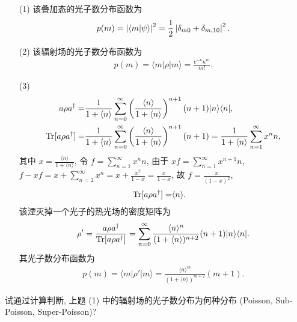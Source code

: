 \documentclass{assignment}
\begin{document}
\begin{sol}
    \begin{itemize}
        \item[(1)] 该叠加态的光子数分布函数为
        \begin{align}
            p(m)=\left\lvert\langle m\vert\psi\rangle\right\rvert^2=\frac{1}{2}\left\lvert\delta_{m0}+\delta_{m,10}\right\rvert^2.
        \end{align}
        \item[(2)] 该辐射场的光子数分布函数为
        \begin{align}
            p(m)=\langle m\rvert\rho\lvert m\rangle=\frac{e^{-\kappa}\kappa^m}{m!}.
        \end{align}
        \item[(3)] 
        \begin{align}
            a\rho a^{\dagger}=&\frac{1}{1+\langle n\rangle}\sum_{n=0}^{\infty}\left(\frac{\langle n\rangle}{1+\langle n\rangle}\right)^{n+1}(n+1)\lvert n\rangle\langle n\rvert,\\
            \notag\operatorname{Tr}[a\rho a^{\dagger}]=&\frac{1}{1+\langle n\rangle}\sum_{n=0}^{\infty}\left(\frac{\langle n\rangle}{1+\langle n\rangle}\right)^{n+1}(n+1)=\frac{1}{1+\langle n\rangle}\sum_{n=1}^{\infty}x^nn,
        \end{align}
        其中 $x=\frac{\langle n\rangle}{1+\langle n\rangle}$, 令 $f=\sum_{n=1}^{\infty}x^nn$, 由于 $xf=\sum_{n=1}^{\infty}x^{n+1}n$, $f-xf=x+\sum_{n=2}^{\infty}x^n=x+\frac{x^2}{1-x}=\frac{x}{1-x}$, 故 $f=\frac{x}{(1-x)^2}$,
        \begin{align}
            \operatorname{Tr}[a\rho a^{\dagger}]=&\langle n\rangle.
        \end{align}
        该湮灭掉一个光子的热光场的密度矩阵为
        \begin{align}
            \rho'=\frac{a\rho a^{\dagger}}{\operatorname{Tr}[a\rho a^{\dagger}]}=\sum_{n=0}^{\infty}\frac{\langle n\rangle^n}{(1+\langle n\rangle)^{n+2}}(n+1)\lvert n\rangle\langle n\rvert.
        \end{align}
        其光子数分布函数为
        \begin{align}
            p(m)=\langle m\rvert\rho'\lvert m\rangle=\frac{\langle n\rangle^m}{(1+\langle n\rangle)^{m+2}}(m+1).
        \end{align}
    \end{itemize}
\end{sol}

\begin{prob}[20 分]
    试通过计算判断, 上题 (1) 中的辐射场的光子数分布为何种分布 (Poisson, Sub-Poisson, Super-Poisson)?
\end{prob}
\begin{sol}
    
\end{sol}
\end{document}
